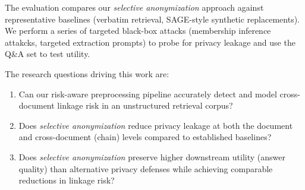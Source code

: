 The evaluation compares our \textit{selective anonymization} approach against representative baselines (verbatim retrieval, SAGE-style synthetic replacements). We perform a series of targeted black-box attacks (membership inference attakcks, targeted extraction prompts) to probe for privacy leakage and use the Q\&A set to test utility.

The research questions driving this work are:
\begin{enumerate}
  \item Can our risk-aware preprocessing pipeline accurately detect and model cross-document linkage risk in an unstructured retrieval corpus?
  \item Does \textit{selective anonymization} reduce privacy leakage at both the document and cross-document (chain) levels compared to established baselines?
  \item Does \textit{selective anonymization} preserve higher downstream utility (answer quality) than alternative privacy defenses while achieving comparable reductions in linkage risk?
\end{enumerate}



